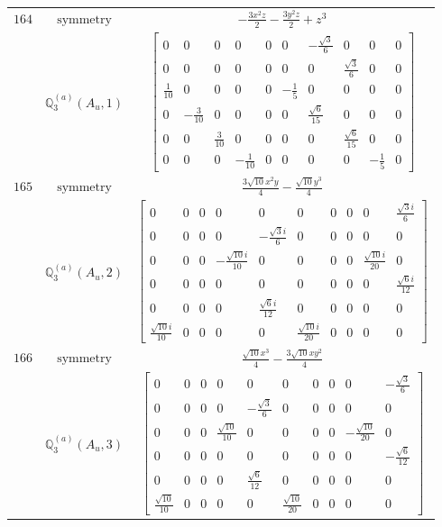 \documentclass[fleqn,8pt,landscape]{jsarticle}
\begin{document}
\begin{longtable}{ccc}
$ 164 $ & $ \text{symmetry} $ & $ - \frac{3 x^{2} z}{2} - \frac{3 y^{2} z}{2} + z^{3} $ \\
$  $ & $ \mathbb{Q}_{3}^{(a)}(A_{u},1) $ & $ \begin{bmatrix} 0 & 0 & 0 & 0 & 0 & 0 & - \frac{\sqrt{3}}{6} & 0 & 0 & 0 \\ 0 & 0 & 0 & 0 & 0 & 0 & 0 & \frac{\sqrt{3}}{6} & 0 & 0 \\ \frac{1}{10} & 0 & 0 & 0 & 0 & - \frac{1}{5} & 0 & 0 & 0 & 0 \\ 0 & - \frac{3}{10} & 0 & 0 & 0 & 0 & \frac{\sqrt{6}}{15} & 0 & 0 & 0 \\ 0 & 0 & \frac{3}{10} & 0 & 0 & 0 & 0 & \frac{\sqrt{6}}{15} & 0 & 0 \\ 0 & 0 & 0 & - \frac{1}{10} & 0 & 0 & 0 & 0 & - \frac{1}{5} & 0 \end{bmatrix} $ \\ \hline
$ 165 $ & $ \text{symmetry} $ & $ \frac{3 \sqrt{10} x^{2} y}{4} - \frac{\sqrt{10} y^{3}}{4} $ \\
$  $ & $ \mathbb{Q}_{3}^{(a)}(A_{u},2) $ & $ \begin{bmatrix} 0 & 0 & 0 & 0 & 0 & 0 & 0 & 0 & 0 & \frac{\sqrt{3} i}{6} \\ 0 & 0 & 0 & 0 & - \frac{\sqrt{3} i}{6} & 0 & 0 & 0 & 0 & 0 \\ 0 & 0 & 0 & - \frac{\sqrt{10} i}{10} & 0 & 0 & 0 & 0 & \frac{\sqrt{10} i}{20} & 0 \\ 0 & 0 & 0 & 0 & 0 & 0 & 0 & 0 & 0 & \frac{\sqrt{6} i}{12} \\ 0 & 0 & 0 & 0 & \frac{\sqrt{6} i}{12} & 0 & 0 & 0 & 0 & 0 \\ \frac{\sqrt{10} i}{10} & 0 & 0 & 0 & 0 & \frac{\sqrt{10} i}{20} & 0 & 0 & 0 & 0 \end{bmatrix} $ \\ \hline
$ 166 $ & $ \text{symmetry} $ & $ \frac{\sqrt{10} x^{3}}{4} - \frac{3 \sqrt{10} x y^{2}}{4} $ \\
$  $ & $ \mathbb{Q}_{3}^{(a)}(A_{u},3) $ & $ \begin{bmatrix} 0 & 0 & 0 & 0 & 0 & 0 & 0 & 0 & 0 & - \frac{\sqrt{3}}{6} \\ 0 & 0 & 0 & 0 & - \frac{\sqrt{3}}{6} & 0 & 0 & 0 & 0 & 0 \\ 0 & 0 & 0 & \frac{\sqrt{10}}{10} & 0 & 0 & 0 & 0 & - \frac{\sqrt{10}}{20} & 0 \\ 0 & 0 & 0 & 0 & 0 & 0 & 0 & 0 & 0 & - \frac{\sqrt{6}}{12} \\ 0 & 0 & 0 & 0 & \frac{\sqrt{6}}{12} & 0 & 0 & 0 & 0 & 0 \\ \frac{\sqrt{10}}{10} & 0 & 0 & 0 & 0 & \frac{\sqrt{10}}{20} & 0 & 0 & 0 & 0 \end{bmatrix} $ \\ \hline

\end{longtable}
\end{document}
